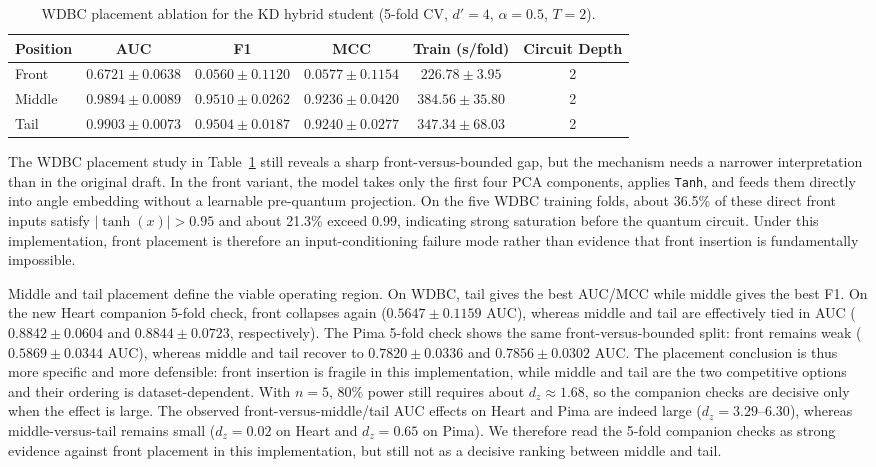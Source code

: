 \documentclass[11pt,a4paper]{article}
\begin{document}
\begin{table}[t]
\caption{WDBC placement ablation for the KD hybrid student (5-fold CV, $d'=4$, $\alpha=0.5$, $T=2$).}
\label{tab:ablation_pos}
\centering\small
\begin{tabular}{lccccc}
\toprule
Position & AUC & F1 & MCC & Train (s/fold) & Circuit Depth \\
\midrule
Front  & $0.6721 \pm 0.0638$ & $0.0560 \pm 0.1120$ & $0.0577 \pm 0.1154$ & $226.78 \pm 3.95$ & 2 \\
Middle & $0.9894 \pm 0.0089$ & $0.9510 \pm 0.0262$ & $0.9236 \pm 0.0420$ & $384.56 \pm 35.80$ & 2 \\
Tail   & $0.9903 \pm 0.0073$ & $0.9504 \pm 0.0187$ & $0.9240 \pm 0.0277$ & $347.34 \pm 68.03$ & 2 \\
\bottomrule
\end{tabular}
\end{table}

The WDBC placement study in Table~\ref{tab:ablation_pos} still reveals a sharp front-versus-bounded
gap, but the mechanism needs a narrower interpretation than in the original draft. In the front
variant, the model takes only the first four PCA components, applies \texttt{Tanh}, and feeds them
directly into angle embedding without a learnable pre-quantum projection. On the five WDBC training
folds, about 36.5\% of these direct front inputs satisfy $|\tanh(x)| > 0.95$ and about 21.3\%
exceed 0.99, indicating strong saturation before the quantum circuit. Under this implementation,
front placement is therefore an input-conditioning failure mode rather than evidence that front
insertion is fundamentally impossible.

Middle and tail placement define the viable operating region. On WDBC, tail gives the best AUC/MCC
while middle gives the best F1. On the new Heart companion 5-fold check, front collapses again
($0.5647 \pm 0.1159$ AUC), whereas middle and tail are effectively tied in AUC
($0.8842 \pm 0.0604$ and $0.8844 \pm 0.0723$, respectively). The Pima 5-fold check shows the same
front-versus-bounded split: front remains weak ($0.5869 \pm 0.0344$ AUC), whereas middle and tail
recover to $0.7820 \pm 0.0336$ and $0.7856 \pm 0.0302$ AUC. The placement conclusion is thus more
specific and more defensible: front insertion is fragile in this implementation, while middle and
tail are the two competitive options and their ordering is dataset-dependent. With $n=5$, 80\%
power still requires about $d_z \approx 1.68$, so the companion checks are decisive only when the
effect is large. The observed front-versus-middle/tail AUC effects on Heart and Pima are indeed
large ($d_z=3.29$--$6.30$), whereas middle-versus-tail remains small ($d_z=0.02$ on Heart and
$d_z=0.65$ on Pima). We therefore read the 5-fold companion checks as strong evidence against front
placement in this implementation, but still not as a decisive ranking between middle and tail.
\end{document}

